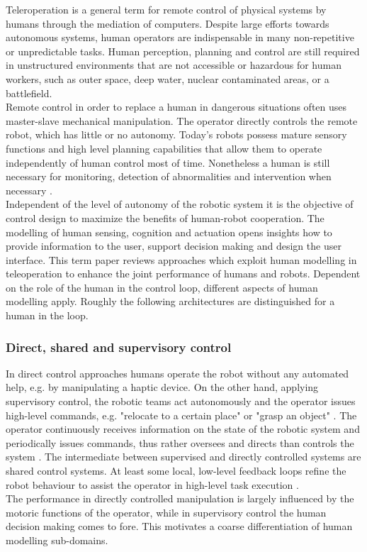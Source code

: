 \documentclass[a4paper,twoside, openright,12pt]{report}
\begin{document}
Teleroperation is a general term for remote control of physical systems by humans through the mediation of computers. Despite large efforts towards autonomous systems, human operators are indispensable in many non-repetitive or unpredictable tasks. Human perception, planning and control are still required in unstructured environments that are not accessible or hazardous for human workers, such as outer space, deep water, nuclear contaminated areas, or a battlefield.\\
Remote control in order to replace a human in dangerous situations often uses master-slave mechanical manipulation. The operator directly controls the remote robot, which has little or no autonomy. Today's robots possess mature sensory functions and high level planning capabilities that allow them to operate independently of human control most of time. Nonetheless a human is still necessary for monitoring, detection of abnormalities and intervention when necessary \cite{Sheridian1992}.\\
Independent of the level of autonomy of the robotic system it is the objective of control design to maximize the benefits of human-robot cooperation. The modelling of human sensing, cognition and actuation opens insights how to provide information to the user, support decision making and design the user interface. This term paper reviews approaches which exploit human modelling in teleoperation to enhance the joint performance of humans and robots.
Dependent on the role of the human in the control loop, different aspects of human modelling apply. Roughly the following architectures are distinguished for a human in the loop.

\subsubsection{Direct, shared and supervisory control} 
In direct control approaches humans operate the robot without any automated help, e.g. by manipulating a haptic device. On the other hand, applying supervisory control, the robotic teams act autonomously and the operator issues high-level commands, e.g. "relocate to a certain place" or "grasp an object" \cite{Peters2015}. The operator continuously receives information on the state of the robotic system and periodically issues commands, thus rather oversees and directs than controls the system \cite{Sheridian1992}.
The intermediate between supervised and directly controlled systems are shared control systems. At least some local, low-level feedback loops refine the robot behaviour to assist the operator in high-level task execution \cite{TeleoperationHandbook}.\\
The performance in directly controlled manipulation is largely influenced by the motoric functions of the operator, while in supervisory control the human decision making comes to fore. This motivates a coarse differentiation of human modelling sub-domains. 
\end{document}
